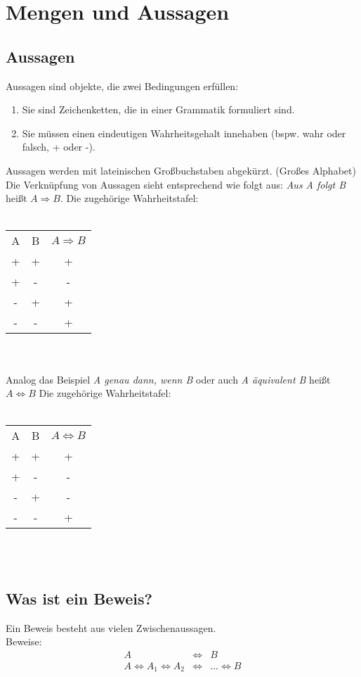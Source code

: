 \documentclass[12pt]{article}
\begin{document}
\section{Mengen und Aussagen}
\subsection{Aussagen}
Aussagen sind objekte, die zwei Bedingungen erfüllen:
\begin{enumerate}
    \item Sie sind Zeichenketten, die in einer Grammatik formuliert sind.
    \item Sie müssen einen eindeutigen Wahrheitsgehalt innehaben (bspw. wahr oder falsch, + oder -).
\end{enumerate}
Aussagen werden mit lateinischen Großbuchstaben abgekürzt. (Großes Alphabet) \\
Die Verknüpfung von Aussagen sieht entsprechend wie folgt aus: \textit{Aus A folgt B} heißt $A\Rightarrow B$.
Die zugehörige Wahrheitstafel: \\ \\
\begin{tabular}{c|c|c}
    A & B & $A\Rightarrow B$ \\
    + & + & + \\
    + & - & - \\
    - & + & + \\
    - & - & +
\end{tabular} 
\\ \\
Analog das Beispiel \textit{A genau dann, wenn B} oder auch \textit{A äquivalent B} heißt $A\Leftrightarrow B$ Die zugehörige Wahrheitstafel: \\ \\
\begin{tabular}{c|c|c}
    A & B & $A\Leftrightarrow B$ \\
    + & + & + \\
    + & - & - \\
    - & + & - \\
    - & - & +
\end{tabular} 
\\ \\
\subsection{Was ist ein Beweis?}
Ein Beweis besteht aus vielen Zwischenaussagen. \\
Beweise:
\begin{eqnarray*}
    A&\Leftrightarrow& B \\
    A\Leftrightarrow A_{1}\Leftrightarrow A_{2}&\Leftrightarrow& ...\Leftrightarrow B
\end{eqnarray*}
\end{document}
